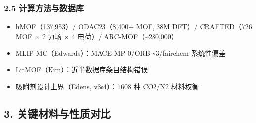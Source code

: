 \documentclass[12pt,a4paper]{ctexart}
\providecommand{\tightlist}{%
  \setlength{\itemsep}{0pt}\setlength{\parskip}{0pt}}
\begin{document}
\subsubsection{2.5 计算方法与数据库}\label{ux8ba1ux7b97ux65b9ux6cd5ux4e0eux6570ux636eux5e93}

\begin{itemize}
\tightlist
\item
  hMOF（137,953）/ ODAC23（8,400+ MOF, 38M DFT）/ CRAFTED（726 MOF × 2 力场 × 4 电荷）/ ARC-MOF（\textasciitilde280,000）
\item
  MLIP-MC（Edwards）：MACE-MP-0/ORB-v3/fairchem 系统性偏差
\item
  LitMOF（Kim）：近半数据库条目结构错误
\item
  吸附剂设计上界（Edens, v3s4）：1608 种 CO2/N2 材料权衡
\end{itemize}

\subsection{3. 关键材料与性质对比}\label{ux5173ux952eux6750ux6599ux4e0eux6027ux8d28ux5bf9ux6bd4}
\end{document}
